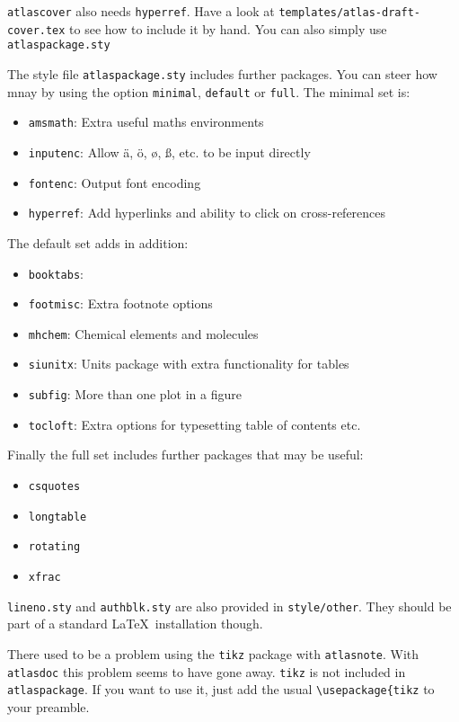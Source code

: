 \documentclass[koma,UKenglish]{style/atlasdoc}
\begin{document}
\texttt{atlascover} also needs \texttt{hyperref}. 
Have a look at \texttt{templates/atlas-draft-cover.tex} to see how to include it by hand.
You can also simply use \texttt{atlaspackage.sty}

The style file \texttt{atlaspackage.sty} includes further packages.
You can steer how mnay by using the option \texttt{minimal}, \texttt{default} or \texttt{full}.
The minimal set is:
\begin{itemize}\setlength{\parskip}{0pt}\setlength{\itemsep}{0pt}
\item \texttt{amsmath}: Extra useful maths environments
\item \texttt{inputenc}: Allow ä, ö, ø, ß, etc. to be input directly
\item \texttt{fontenc}: Output font encoding
\item \texttt{hyperref}: Add hyperlinks and ability to click on cross-references
\end{itemize}

The default set adds in addition:
\begin{itemize}\setlength{\parskip}{0pt}\setlength{\itemsep}{0pt}
\item \texttt{booktabs}:
\item \texttt{footmisc}: Extra footnote options
\item \texttt{mhchem}: Chemical elements and molecules
\item \texttt{siunitx}: Units package with extra functionality for tables
\item \texttt{subfig}: More than one plot in a figure
\item \texttt{tocloft}: Extra options for typesetting table of contents etc.
\end{itemize}

Finally the full set includes further packages that may be useful:
\begin{itemize}\setlength{\parskip}{0pt}\setlength{\itemsep}{0pt}
\item \texttt{csquotes}
\item \texttt{longtable}
\item \texttt{rotating}
\item \texttt{xfrac}
\end{itemize}

\texttt{lineno.sty} and \texttt{authblk.sty} are also provided in \texttt{style/other}.
They should be part of a standard \LaTeX\ installation though.

There used to be a problem using the \texttt{tikz} package with \texttt{atlasnote}.
With \texttt{atlasdoc} this problem seems to have gone away.
\texttt{tikz} is not included in \texttt{atlaspackage}.
If you want to use it, just add the usual \verb|\usepackage{tikz| to your preamble.
\end{document}
